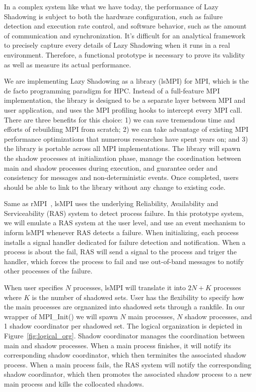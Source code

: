 In a complex system like what we have today, the performance of Lazy Shadowing is subject to both the hardware configuration, such as failure detection and execution rate control, and software behavior, such as the amount of communication and synchronization. 
It's difficult for an analytical framework to precisely capture every details of Lazy Shadowing when it runs in a real environment. Therefore, a functional prototype is necessary to prove its validity as well as measure its actual performance. 

We are implementing Lazy Shadowing as a library (lsMPI) for MPI, which is the de facto programming paradigm for HPC. Instead of a full-feature MPI implementation, the library is designed to be a separate layer between MPI and user application, and uses the MPI profiling hooks to intercept every MPI call. There are three benefits for this choice: 1) we can save tremendous time and efforts of rebuilding MPI from scratch; 2) we can take advantage of existing MPI performance optimizations that numerous researches have spent years on; and 3) the library is portable across all MPI implementations. 
The library will spawn the shadow processes at initialization phase, manage the coordination between main and shadow processes during execution, and guarantee order and consistency for messages and non-deterministic events.
Once completed, users should be able to link to the library without any change to existing code. 

Same as rMPI~\cite{ferreira_sc_2011}, lsMPI uses the underlying Reliability, Availability and Serviceability (RAS) system to detect process failure. In this prototype system, we will emulate a RAS system at the user level, and use an event mechanism to inform lsMPI whenever RAS detects a failure. When initializing, each process installs a signal handler dedicated for failure detection and notification. When a process is about the fail, RAS will send a signal to the process and triger the handler, which forces the process to fail and use out-of-band messages to notify other processes of the failure. 

When user specifies $N$ processes, lsMPI will translate it into $2N + K$ processes where $K$ is the number of shadowed sets. User has the flexibility to specify how the main processes are orgnanized into shadowed sets through a rankfile. In our wrapper of MPI\_Init() we will spawn $N$ main processes, $N$ shadow processes, and 1 shadow coordinator per shadowed set. The logical organization is depicted in Figure~\ref{fig:logical_org}. Shadow coordinator manages the coordination between main and shadow processes. When a main process finishes, it will notify its corresponding shadow coordinator, which then terminites the associated shadow process. When a main process fails, the RAS system will notify the corresponding shadow coordinator, which then promotes the associated shadow process to a new main process and kills the collocated shadows.

